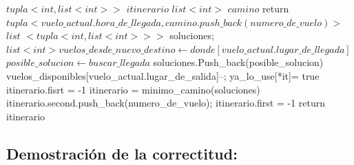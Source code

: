 \documentclass[a4paper]{article}
\begin{document}
\vspace{0.2cm}
\begin{algorithmic}[1]

        \State $tupla<int , list<int> >$ $itinerario$ 
        		\State $list<int>$ $camino$
        		\State return $tupla<vuelo\_actual.hora\_de\_llegada, camino.push\_back(numero\_de\_vuelo) >$
        	\Else 
       			\State $list$ $<tupla<int, list<int> > >$ soluciones;
       			\State $list<int> vuelos\_desde\_nuevo\_destino \gets donde[vuelo\_actual.lugar\_de\_llegada]$ 		 
						\State $posible\_solucion\gets buscar\_llegada$
						\State soluciones.Push\_back(posible\_solucion)
						\State vuelos\_disponibles[vuelo\_actual.lugar\_de\_salida]--;
						\State ya\_lo\_use[*it]= true
					\EndIf					
				\EndFor
					\State itinerario.fisrt = -1
				\Else
					\State itinerario =  minimo\_camino(soluciones)
					\State itinerario.second.push\_back(numero\_de\_vuelo);
				\EndIf
			\Else
				\State itinerario.first = -1
			\EndIf
			\State return itinerario
		 \EndIf			 	
\EndProcedure
\end{algorithmic}

\subsection{Demostración de la correctitud:}
\end{document}

